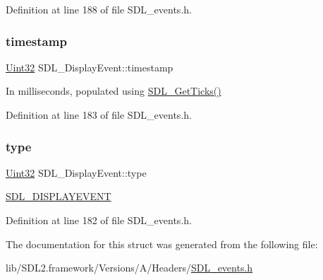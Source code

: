 Definition at line 188 of file S\+D\+L\+\_\+events.\+h.

\mbox{\label{struct_s_d_l___display_event_a6c4cd9f63a2ff62032602193c9bf605d}} 
\subsubsection{\texorpdfstring{timestamp}{timestamp}}
{\footnotesize\ttfamily \mbox{\hyperlink{_s_d_l__stdinc_8h_add440eff171ea5f55cb00c4a9ab8672d}{Uint32}} S\+D\+L\+\_\+\+Display\+Event\+::timestamp}

In milliseconds, populated using \mbox{\hyperlink{_s_d_l__timer_8h_a0b9bc71d6287e0ffafdc3419760fe2b3}{S\+D\+L\+\_\+\+Get\+Ticks()}} 

Definition at line 183 of file S\+D\+L\+\_\+events.\+h.

\mbox{\label{struct_s_d_l___display_event_a5f4993ce9c5289a2ac046ae7a6dff544}} 
\subsubsection{\texorpdfstring{type}{type}}
{\footnotesize\ttfamily \mbox{\hyperlink{_s_d_l__stdinc_8h_add440eff171ea5f55cb00c4a9ab8672d}{Uint32}} S\+D\+L\+\_\+\+Display\+Event\+::type}

\mbox{\hyperlink{_s_d_l__events_8h_a3b589e89be6b35c02e0dd34a55f3fccaa825818ce6265316146d7288601fd5974}{S\+D\+L\+\_\+\+D\+I\+S\+P\+L\+A\+Y\+E\+V\+E\+NT}} 

Definition at line 182 of file S\+D\+L\+\_\+events.\+h.



The documentation for this struct was generated from the following file\+:\begin{DoxyCompactItemize}
\item 
lib/\+S\+D\+L2.\+framework/\+Versions/\+A/\+Headers/\mbox{\hyperlink{_s_d_l__events_8h}{S\+D\+L\+\_\+events.\+h}}\end{DoxyCompactItemize}
